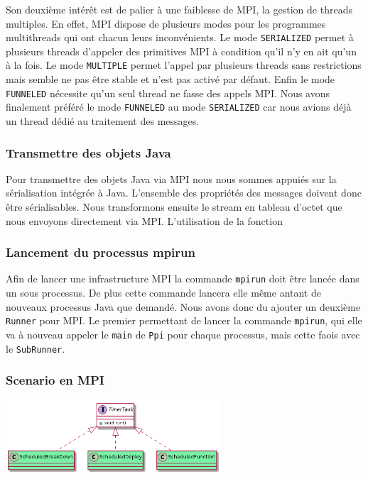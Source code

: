 \documentclass{article}
\begin{document}
				Son deuxième intérêt est de palier à une faiblesse de MPI, la gestion de threads
				multiples. En effet, MPI dispose de plusieurs modes pour les programmes
				multithreads qui ont chacun leurs inconvénients. Le mode \lstinline{SERIALIZED}
				permet à plusieurs threads d'appeler
				des primitives MPI à condition qu'il n'y en ait qu'un à la fois. Le mode
				\lstinline{MULTIPLE} permet l'appel par plusieurs threads sans restrictions mais
				semble ne pas être stable et n'est pas activé par défaut. Enfin le mode
				\lstinline{FUNNELED} nécessite qu'un seul thread ne fasse des appels MPI.
				Nous avons finalement préféré le mode \lstinline{FUNNELED} au mode
				\lstinline{SERIALIZED} car nous avions déjà un thread dédié au traitement des
				messages.

				\subsubsection{Transmettre des objets Java}
				Pour transmettre des objets Java via MPI nous nous sommes appuiés sur la sérialisation
				intégrée à Java. L'ensemble des propriétés des messages doivent donc être sérialisables.
				Nous transformons ensuite le stream en tableau d'octet que nous envoyons directement
				via MPI. L'utilisation de la fonction \lstinline{}

				\subsubsection{Lancement du processus mpirun}
				Afin de lancer une infrastructure MPI la commande \lstinline{mpirun} doit être lancée
				dans un sous processus. De plus cette commande lancera elle même antant de nouveaux
				processus Java que demandé. Nous avons donc du ajouter un deuxième \lstinline{Runner}
				pour MPI. Le premier permettant de lancer la commande \lstinline{mpirun}, qui elle
				va à nouveau appeler le \lstinline{main} de \lstinline{Ppi} pour chaque processus,
				mais cette faois avec le \lstinline{SubRunner}.
					\newpage
				\subsubsection{Scenario en MPI}
				\vspace{5mm}
				\hspace*{4cm} \includegraphics[width=80mm]{uml/scenMPIuml.png}
				
\end{document}
